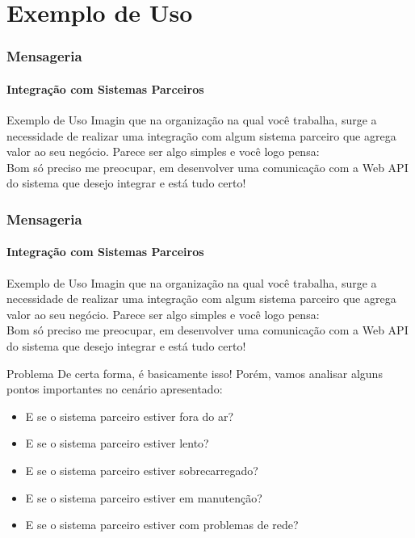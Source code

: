 \documentclass[
	9pt, %
	t, %
]{beamer}
\begin{document}

\section{Exemplo de Uso}

\begin{frame}
	\frametitle{Mensageria}
	\framesubtitle{Integração com Sistemas Parceiros}

	\begin{block}{Exemplo de Uso}
		Imagin que na organização na qual você trabalha, surge a necessidade de realizar uma integração com algum sistema parceiro que agrega valor ao seu negócio. Parece ser algo simples e você logo pensa:
		\\ \bigskip
		\alert{Bom só preciso me preocupar, em desenvolver uma comunicação com a Web API do sistema que desejo integrar e está tudo certo!}

	\end{block}

\end{frame}

\begin{frame}
	\frametitle{Mensageria}
	\framesubtitle{Integração com Sistemas Parceiros}

	\begin{block}{Exemplo de Uso}
		Imagin que na organização na qual você trabalha, surge a necessidade de realizar uma integração com algum sistema parceiro que agrega valor ao seu negócio. Parece ser algo simples e você logo pensa:
		\\ \bigskip
		\alert{Bom só preciso me preocupar, em desenvolver uma comunicação com a Web API do sistema que desejo integrar e está tudo certo!}

	\end{block}

	\begin{block}{Problema}
		De certa forma, é basicamente isso! Porém, vamos analisar alguns pontos importantes no cenário apresentado:
		\begin{itemize}
			\item E se o sistema parceiro estiver fora do ar?
			\item E se o sistema parceiro estiver lento?
			\item E se o sistema parceiro estiver sobrecarregado?
			\item E se o sistema parceiro estiver em manutenção?
			\item E se o sistema parceiro estiver com problemas de rede?
		\end{itemize}
	\end{block}

\end{frame}
\end{document}
